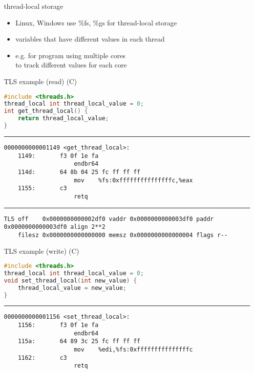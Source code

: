 \begin{frame}{thread-local storage}
    \begin{itemize}
    \item Linux, Windows use \%fs, \%gs for thread-local storage
    \vspace{.5cm}
    \item variables that have different values in each thread
    \item e.g. for program using multiple cores \\ 
          to track different values for each core
    \end{itemize}
\end{frame}

\begin{frame}[fragile,label=tlsExample1]{TLS example (read) (C)}
\begin{lstlisting}[language=C,style=size10]
#include <threads.h>
thread_local int thread_local_value = 0;
int get_thread_local() {
    return thread_local_value;
}
\end{lstlisting}
\hrule
\begin{Verbatim}[fontsize=\fontsize{10}{11}\selectfont]
0000000000001149 <get_thread_local>:
    1149:       f3 0f 1e fa             
                    endbr64 
    114d:       64 8b 04 25 fc ff ff ff
                    mov    %fs:0xfffffffffffffffc,%eax
    1155:       c3  
                    retq   
\end{Verbatim}
\hrule
\begin{Verbatim}[fontsize=\fontsize{9}{10}\selectfont]
TLS off    0x0000000000002df0 vaddr 0x0000000000003df0 paddr 0x0000000000003df0 align 2**2
    filesz 0x0000000000000000 memsz 0x0000000000000004 flags r--
\end{Verbatim}
\end{frame}

\begin{frame}[fragile,label=tlsExample2]{TLS example (write) (C)}
\begin{lstlisting}[language=C,style=size10]
#include <threads.h>
thread_local int thread_local_value = 0;
void set_thread_local(int new_value) {
    thread_local_value = new_value;
}
\end{lstlisting}
\hrule
\begin{Verbatim}[fontsize=\fontsize{10}{11}\selectfont]
0000000000001156 <set_thread_local>:
    1156:       f3 0f 1e fa 
                    endbr64 
    115a:       64 89 3c 25 fc ff ff ff
                    mov    %edi,%fs:0xfffffffffffffffc
    1162:       c3
                    retq
\end{Verbatim}
\end{frame}


